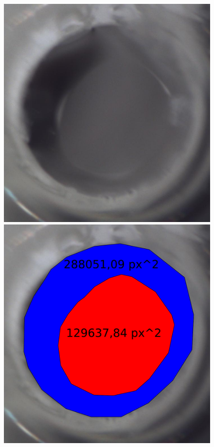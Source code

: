 \documentclass[a4paper,ngerman]{scrartcl}
\begin{document}
\begin{figure}[tbh!]
  \centering
  \begin{minipage}[b]{.4\textwidth}
    \includegraphics[width=1.\textwidth]{abbildungen/lipid5final_cut.jpg}
  \end{minipage}
  \begin{minipage}[b]{.4\textwidth}
    \includegraphics[width=1.\textwidth]{abbildungen/flaechenbestimmung.pdf}

\end{minipage}
\end{figure}
\end{document}

